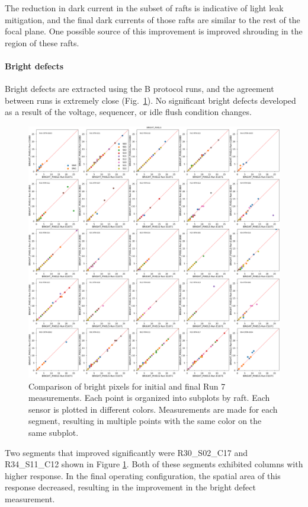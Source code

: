 The reduction in dark current in the subset of rafts is indicative of light leak mitigation, and the final dark currents of those rafts are similar to the rest of the focal plane. One possible source of this improvement is improved shrouding in the region of these rafts.

\clearpage

\paragraph{Bright defects}\label{final-bright-defects}

Bright defects are extracted using the B protocol runs, and the agreement between runs is extremely close (Fig.~\ref{fig:finalChar-BrightPixels-5x5}). No significant bright defects developed as a result of the voltage, sequencer, or idle flush condition changes.

\begin{figure}[ht]
    \centering
    \includegraphics[width=0.7\linewidth]{figures/finalCharacterization/E1071_E1880_BRIGHT_PIXELS.png}
    \caption{Comparison of bright pixels for initial and final Run 7 measurements. Each point is organized into subplots by raft. Each sensor is plotted in different colors. Measurements are made for each segment, resulting in multiple points with the same color on the same subplot.}
    \label{fig:finalChar-BrightPixels-5x5}
\end{figure}

Two segments that improved significantly were R30\_S02\_C17 and R34\_S11\_C12 shown in Figure \ref{fig:finalChar-BrightPixels-5x5}. Both of these segments exhibited columns with higher response. In the final operating configuration, the spatial area of this response decreased, resulting in the improvement in the bright defect measurement.

